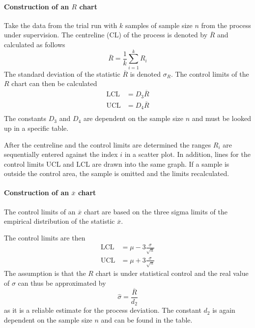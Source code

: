 \documentclass[11pt]{article}
\theoremstyle{definition}
\newcommand*\samplemean[1]{\overline{#1}}
\begin{document}
\paragraph{Construction of an $R$ chart} Take the data from the trial run with $k$ samples of sample size $n$ from the process under supervision. The centreline (CL) of the process is denoted by $\samplemean{R}$ and calculated as follows
\begin{equation*}
	\samplemean{R} = \frac{1}{k}\sum_{i=1}^{k}R_i
\end{equation*}
The standard deviation of the statistic $\samplemean{R}$ is denoted $\sigma_R$. The control limits of the $R$ chart can then be calculated
\begin{align}
	\text{LCL} &= D_3\samplemean{R}\\
	\text{UCL} &= D_4\samplemean{R}\\
\end{align}
The constants $D_3$ and $D_4$ are dependent on the sample size $n$ and must be looked up in a specific table.

After the centreline and the control limits are determined the ranges $R_i$ are sequentially entered against the index $i$ in a scatter plot. In addition, lines for the control limits UCL and LCL are drawn into the same graph. If a sample is outside the control area, the sample is omitted and the limits recalculated.

\paragraph{Construction of an $\samplemean{x}$ chart} The control limits of an $\samplemean{x}$ chart are based on the three sigma limits of the empirical distribution of the statistic $\samplemean{x}$.

The control limits are then
\begin{align}
	\text{LCL} &= \mu - 3 \frac{\sigma}{\sqrt{n}}\\
	\text{UCL} &= \mu + 3 \frac{\sigma}{\sqrt{n}}
\end{align}
The assumption is that the $R$ chart is under statistical control and the real value of $\sigma$ can thus be approximated by
\begin{equation*}
	\hat{\sigma} = \frac{\samplemean{R}}{d_2}
\end{equation*}
as it is a reliable estimate for the process deviation. The constant $d_2$ is again dependent on the sample size $n$ and can be found in the table.
\end{document}

